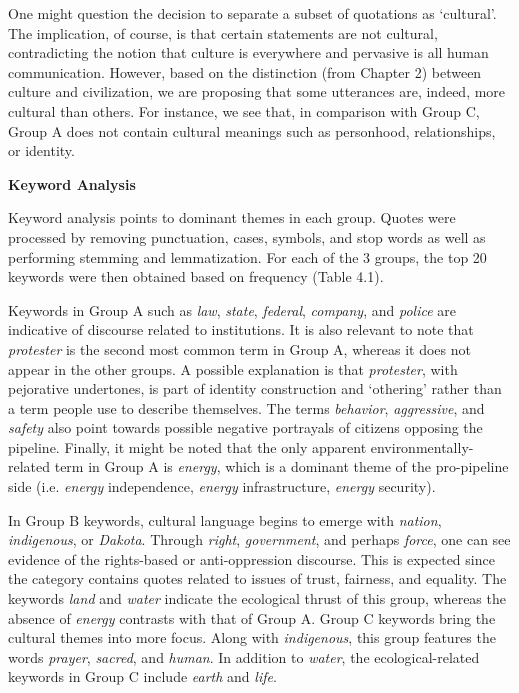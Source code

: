 One might question the decision to separate a subset of quotations as `cultural'. The implication, of course, is that certain statements are not cultural, contradicting the notion that culture is everywhere and pervasive is all human communication. However, based on the distinction (from Chapter 2) between culture and civilization, we are proposing that some utterances are, indeed, more cultural than others. For instance, we see that, in comparison with Group C, Group A does not contain cultural meanings such as personhood, relationships, or identity.

\textbf{Keyword Analysis}

Keyword analysis points to dominant themes in each group. Quotes were processed by removing punctuation, cases, symbols, and stop words as well as performing stemming and lemmatization. For each of the 3 groups, the top 20 keywords were then obtained based on frequency (Table 4.1).  

Keywords in Group A such as \textit{law}, \textit{state}, \textit{federal}, \textit{company}, and \textit{police} are indicative of discourse related to institutions. It is also relevant to note that \textit{protester} is the second most common term in Group A, whereas it does not appear in the other groups. A possible explanation is that \textit{protester}, with pejorative undertones, is part of identity construction and `othering' rather than a term people use to describe themselves. The terms \textit{behavior}, \textit{aggressive}, and \textit{safety} also point towards possible negative portrayals of citizens opposing the pipeline. Finally, it might be noted that the only apparent environmentally-related term in Group A is \textit{energy}, which is a dominant theme of the pro-pipeline side (i.e. \textit{energy} independence, \textit{energy} infrastructure, \textit{energy} security).  

In Group B keywords, cultural language begins to emerge with \textit{nation}, \textit{indigenous}, or \textit{Dakota}. Through \textit{right}, \textit{government}, and perhaps \textit{force}, one can see evidence of the rights-based or anti-oppression discourse. This is expected since the category contains quotes related to issues of trust, fairness, and equality. The keywords \textit{land} and \textit{water} indicate the ecological thrust of this group, whereas the absence of \textit{energy} contrasts with that of Group A. Group C keywords bring the cultural themes into more focus. Along with \textit{indigenous}, this group features the words \textit{prayer}, \textit{sacred}, and \textit{human}. In addition to \textit{water}, the ecological-related keywords in Group C include \textit{earth} and \textit{life}.   

